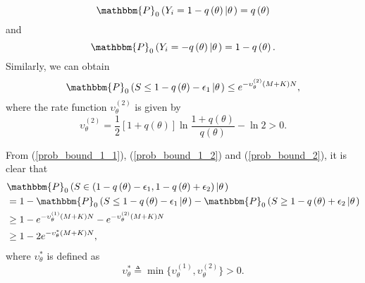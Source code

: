 \documentclass[11pt, draftclsnofoot, onecolumn]{IEEEtran}
\newcommand{\bbP}{\mathbbm{P}}
\begin{document}
\begin{IEEEproof}
\begin{equation}
{\bbP_0}\left( {{Y_i} = 1 - q\left( \theta  \right) \left| \theta  \right.} \right) = q\left( \theta  \right)
\end{equation}
and
\begin{equation}  \label{pmf_Y_2}
{\bbP_0}\left( {{Y_i} = -q\left( \theta  \right) \left| \theta  \right.} \right) = 1- q\left( \theta  \right).
\end{equation}
Similarly, we can obtain
\begin{equation} \label{prob_bound_2}
{\bbP_0}\left( {S \le 1 - q\left( \theta  \right) - {\epsilon _1}\left| \theta  \right.} \right) \le {e^{ - \upsilon _\theta ^{\left( 2 \right)}\left( {M + K} \right)N}},
\end{equation} 
where the rate function $\upsilon _\theta ^{\left( 2 \right)}$ is given by
\begin{equation} \label{rate_function_2}
\upsilon _\theta ^{\left( 2 \right)} = \frac{1}{2}\left[ {1 + q\left( \theta  \right)} \right]\ln \frac{{1 + q\left( \theta  \right)}}{{q\left( \theta  \right)}} - \ln 2>0.
\end{equation}

From (\ref{prob_bound_1_1}), (\ref{prob_bound_1_2}) and (\ref{prob_bound_2}), it is clear that
\begin{align} \notag
& {\bbP_0}\left( {S \in \left( {1 - q\left( \theta  \right) - {\epsilon _1},1 - q\left( \theta  \right) + {\epsilon _2}} \right)\left| \theta  \right.} \right)\\ \notag
& = 1 - {\bbP_0}\left( {S \le 1 - q\left( \theta  \right) - {\epsilon _1}\left| \theta  \right.} \right) - {\bbP_0}\left( {S \ge 1 - q\left( \theta  \right) + {\epsilon _2}\left| \theta  \right.} \right)\\ \notag
& \ge 1 - {e^{ - \upsilon _\theta ^{\left( 1 \right)}\left( {M + K} \right)N}} - {e^{ - \upsilon _\theta ^{\left( 2 \right)}\left( {M + K} \right)N}}\\
& \ge 1 - 2{e^{ - \upsilon _\theta ^*\left( {M + K} \right)N}},
\end{align}
where $\upsilon _\theta ^*$ is defined as
\begin{equation} \label{gamma_star_define}
\upsilon _\theta ^* \triangleq \min\{\upsilon _\theta ^{( 1 )}, \upsilon _\theta ^{( 2 )}\}>0.
\end{equation}


\end{IEEEproof}
\end{document}
